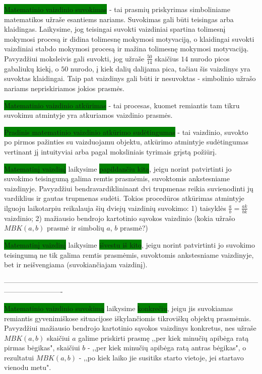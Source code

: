 \documentclass[a4paper]{article}
\begin{document}
\colorbox{green}{Matematinio vaizdinio suvokimas} - tai prasmių priskyrimas simboliniame matematikos užraše esantiems nariams. Suvokimas gali būti teisingas arba klaidingas. Laikysime, jog teisingai suvokti vaizdiniai spartina tolimesnį mokymosi procesą ir didina tolimesnę mokymosi motyvaciją, o klaidingai suvokti vaizdiniai stabdo mokymosi procesą ir mažina tolimesnę mokymosi motyvaciją. Pavyzdžiui moksleivis gali suvokti, jog užraše $\frac{50}{14}$ skaičius $14$ nurodo picos gabaliukų kiekį, o $50$ nurodo, į kiek dalių dalijama pica, tačiau šis vaizdinys yra suvoktas klaidingai. Taip pat vaizdinys gali būti ir nesuvoktas - simbolinio užrašo nariams nepriskiriamos jokios prasmės.

\colorbox{green}{Matematinio vaizdinio atkūrimas} - tai procesas, kuomet remiantis tam tikru suvokimu atmintyje yra atkuriamos vaizdinio prasmės.

\colorbox{green}{Pradinis matematinio vaizdinio atkūrimo sudėtingumas} - tai vaizdinio, suvokto po pirmos pažinties su vaizduojamu objektu, atkūrimo atmintyje sudėtingumas vertinant jį intuityviai arba pagal moksliniais tyrimais grįstą požiūrį.

\colorbox{green}{Matematinį vaizdinį} laikysime \colorbox{green}{papildančiu kitą}, jeigu norint patvirtinti jo suvokimo teisingumą galima remtis prasmėmis, suvoktomis ankstesniame vaizdinyje. Pavyzdžiui bendravardiklininant dvi trupmenas reikia suvienodinti jų vardiklius ir gautas trupmenas sudėti. Tokios procedūros atkūrimas atmintyje ilguoju laikotarpiu reikalauja šių dviejų vaizdinių suvokimo: 1) taisyklės $\frac{a}{b}=\frac{ak}{bk}$ vaizdinio; 2) mažiausio bendrojo kartotinio sąvokos vaizdinio (kokia užrašo $MBK(a,b)$ prasmė ir simbolių $a$, $b$ prasmė?) 

\colorbox{green}{Matematinį vaizdinį} laikysime \colorbox{green}{išvestu iš kito}, jeigu norint patvirtinti jo suvokimo teisingumą ne tik galima remtis prasmėmis, suvoktomis ankstesniame vaizdinyje, bet ir neišvengiama (suvokiančiajam vaizdinį).

-------------------------------------------------------------------------------------------------------------------------------------

\colorbox{green}{Matematinio vaizdinio suvokimą} laikysime \colorbox{green}{konkrečiu}, jeigu jis suvokiamas remiantis gyvenimiškose situacijose iškylančiomis tikroviškų objektų prasmėmis. Pavyzdžiui mažiausio bendrojo kartotinio sąvokos vaizdinys konkretus, nes užraše $MBK(a,b)$ skaičiui $a$ galime priskirti prasmę  ,,per kiek minučių apibėga ratą pirmas bėgikas", skaičiui $b$ - ,,per kiek minučių apibėga ratą antras bėgikas", o rezultatui $MBK(a,b)$ - ,,po kiek laiko jie susitiks starto vietoje, jei startavo vienodu metu". 
\end{document}
